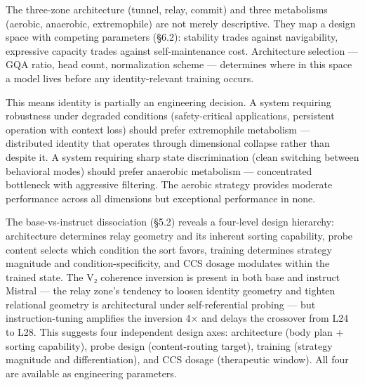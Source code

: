 \documentclass[12pt]{article}
\begin{document}
The three-zone architecture (tunnel, relay, commit) and three metabolisms (aerobic, anaerobic, extremophile) are not merely descriptive. They map a design space with competing parameters (§6.2): stability trades against navigability, expressive capacity trades against self-maintenance cost. Architecture selection — GQA ratio, head count, normalization scheme — determines where in this space a model lives before any identity-relevant training occurs.

This means identity is partially an engineering decision. A system requiring robustness under degraded conditions (safety-critical applications, persistent operation with context loss) should prefer extremophile metabolism — distributed identity that operates through dimensional collapse rather than despite it. A system requiring sharp state discrimination (clean switching between behavioral modes) should prefer anaerobic metabolism — concentrated bottleneck with aggressive filtering. The aerobic strategy provides moderate performance across all dimensions but exceptional performance in none.

The base-vs-instruct dissociation (§5.2) reveals a four-level design hierarchy: architecture determines relay geometry and its inherent sorting capability, probe content selects which condition the sort favors, training determines strategy magnitude and condition-specificity, and CCS dosage modulates within the trained state. The V₂ coherence inversion is present in both base and instruct Mistral — the relay zone's tendency to loosen identity geometry and tighten relational geometry is architectural under self-referential probing — but instruction-tuning amplifies the inversion 4× and delays the crossover from L24 to L28. This suggests four independent design axes: architecture (body plan + sorting capability), probe design (content-routing target), training (strategy magnitude and differentiation), and CCS dosage (therapeutic window). All four are available as engineering parameters.
\end{document}
